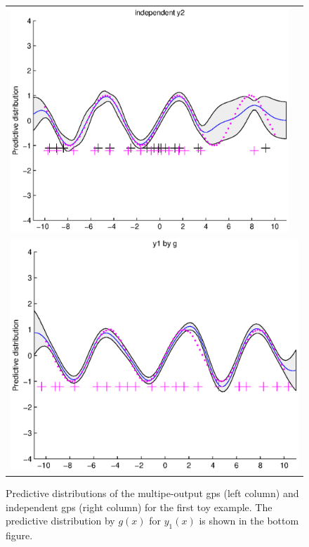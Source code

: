 \begin{figure}
\begin{tabular}{cc}
\includegraphics[scale=0.5]{figures/ssvi-svi2.eps} \\
\multicolumn{2}{c}{\includegraphics[scale=0.5]{figures/ssvi-y1byg.eps} }
\end{tabular}
\label{fig4}
\caption{Predictive distributions of the multipe-output gps (left column) and independent gps (right column) for the first toy example. The predictive distribution by $g(x)$ for $y_1(x)$ is shown in the bottom figure.}
\end{figure}

